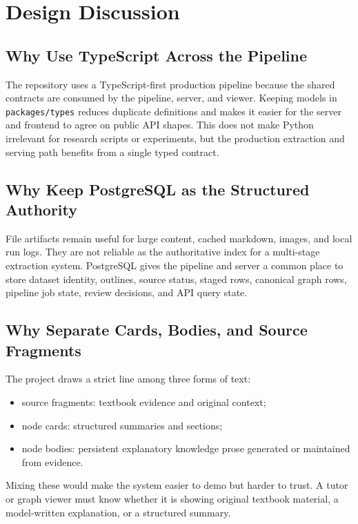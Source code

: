 \documentclass[11pt,letterpaper]{article}
\newcommand{\code}[1]{\nolinkurl{#1}}
\begin{document}
\section{Design Discussion}

\subsection{Why Use TypeScript Across the Pipeline}

The repository uses a TypeScript-first production pipeline because the shared contracts are consumed by the pipeline, server, and viewer. Keeping models in \code{packages/types} reduces duplicate definitions and makes it easier for the server and frontend to agree on public API shapes. This does not make Python irrelevant for research scripts or experiments, but the production extraction and serving path benefits from a single typed contract.

\subsection{Why Keep PostgreSQL as the Structured Authority}

File artifacts remain useful for large content, cached markdown, images, and local run logs. They are not reliable as the authoritative index for a multi-stage extraction system. PostgreSQL gives the pipeline and server a common place to store dataset identity, outlines, source status, staged rows, canonical graph rows, pipeline job state, review decisions, and API query state.

\subsection{Why Separate Cards, Bodies, and Source Fragments}

The project draws a strict line among three forms of text:

\begin{itemize}
  \item source fragments: textbook evidence and original context;
  \item node cards: structured summaries and sections;
  \item node bodies: persistent explanatory knowledge prose generated or maintained from evidence.
\end{itemize}

Mixing these would make the system easier to demo but harder to trust. A tutor or graph viewer must know whether it is showing original textbook material, a model-written explanation, or a structured summary.
\end{document}
